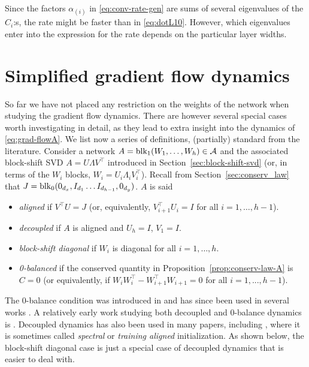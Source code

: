 \documentclass{article}
\def\block{{\rm blk}}
\newcommand{\1}{\mathds{1}}
\newcommand{\bite}{\begin{itemize}}
\newcommand{\eite}{\end{itemize}}
\begin{document}
Since the factors $\alpha_{(i)}$ in \eqref{eq:conv-rate-gen} are sums of several eigenvalues of the $C_i$:s, the rate might be faster than in \eqref{eq:dotL10}. However, which eigenvalues enter into the expression for the rate depends on the particular layer widths.


\section{Simplified gradient flow dynamics}
\label{sec:simplifications}

So far we have not placed any restriction on the weights of the network when studying the gradient flow dynamics. There are however several special cases worth investigating in detail, as they lead to extra insight into the dynamics of \eqref{eq:grad-flowA}. 
We list now a series of definitions, (partially) standard from the literature.
Consider a network $ A =\block_1(W_1, \ldots, W_h)\in \mathcal{ A } $ and the associated block-shift SVD $ A= U \Lambda V^\top $ introduced in Section~\ref{sec:block-shift-svd} (or, in terms of the $ W_i $ blocks, $ W_i = U_i \Lambda_i V_i^\top$). 
Recall from Section~\ref{sec:conserv_law} that $  J= \block_0 (0_{d_x}, I_{d_1} \ldots  I_{d_{h-1}} , 0_{d_y} ) $. $A$ is said 
\bite
\item {\em aligned} if $ V^\top U = J  $ (or, equivalently, $ V_{i+1}^\top U_i =I $ for all $ i=1,\ldots, h-1$).
\item {\em decoupled} if $A$ is aligned and $ U_h = I $, $ V_1 = I $.
\item {\em block-shift diagonal} if $ W_i $ is diagonal for all $ i=1, \ldots, h$. 
\item  {\em 0-balanced} if the conserved quantity in Proposition~\ref{prop:conserv-law-A} is $ C = 0 $ (or equivalently, if $ W_i W_i^\top - W_{i+1}^\top W_{i+1} = 0 $ for all $ i = 1,...,h-1 $).
\eite



The 0-balance condition was introduced in \cite{fukumizu1998effect} and has since been used in several works \cite{arora2018convergence,arora2018optimization,arora2019implicit,domine2023exact}. A relatively early work studying both decoupled and 0-balance dynamics is \cite{saxe2013exact}. Decoupled dynamics has also been used in many papers, including \cite{tarmoun2021understanding,saxe2019mathematical,gidel2019implicit,min2023convergence,lampinen2018analytic}, where it is sometimes called {\em spectral} or {\em training aligned} initialization.
As shown below, the block-shift diagonal case is just a special case of decoupled dynamics that is easier to deal with.
\end{document}
